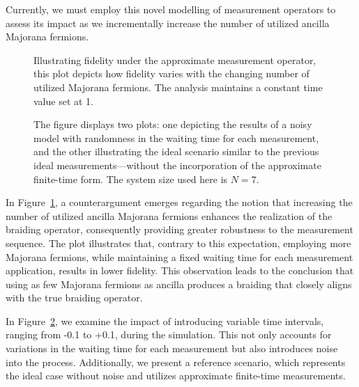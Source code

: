 \documentclass{article}
\begin{document}
Currently, we must employ this novel modelling of measurement operators to assess its impact as we incrementally increase the number of utilized ancilla Majorana fermions.
\begin{figure}
	\begin{center}
		
	\end{center}
	\caption{Illustrating fidelity under the approximate measurement operator, this plot depicts how fidelity varies with the changing number of utilized Majorana fermions. The analysis maintains a constant time value set at 1.}
	\label{fig:fid vs N t=1}
\end{figure}
\begin{figure}
	\begin{center}
		
	\end{center}
	\caption{The figure displays two plots: one depicting the results of a noisy model with randomness in the waiting time for each measurement, and the other illustrating the ideal scenario similar to the previous ideal measurements—without the incorporation of the approximate finite-time form. The system size used here is $ N=7 $.}
	\label{fig:fid vs dt N=7}
\end{figure}
In Figure~\ref{fig:fid vs N t=1}, a counterargument emerges regarding the notion that increasing the number of utilized ancilla Majorana fermions enhances the realization of the braiding operator, consequently providing greater robustness to the measurement sequence. The plot illustrates that, contrary to this expectation, employing more Majorana fermions, while maintaining a fixed waiting time for each measurement application, results in lower fidelity. This observation leads to the conclusion that using as few Majorana fermions as ancilla produces a braiding that closely aligns with the true braiding operator.

In Figure~\ref{fig:fid vs dt N=7}, we examine the impact of introducing variable time intervals, ranging from -0.1 to +0.1, during the simulation. This not only accounts for variations in the waiting time for each measurement but also introduces noise into the process. Additionally, we present a reference scenario, which represents the ideal case without noise and utilizes approximate finite-time measurements.
\end{document}
